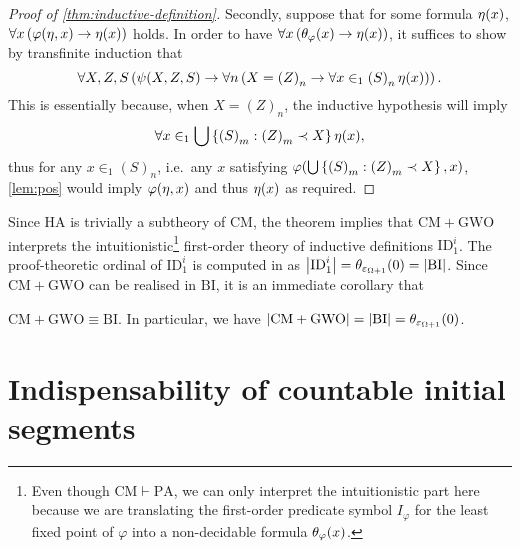 \documentclass[11pt]{article}
\theoremstyle{plain}
\theoremstyle{definition}
\begin{document}
\begin{proof}[Proof of \autoref{thm:inductive-definition}]
    Secondly, suppose that for some formula $\eta\mleft(x\mright)$, $\forall x \left(\varphi\mleft(\eta, x\mright) \rightarrow \eta\mleft(x\mright)\right)$ holds. In order to have $\forall x \left(\theta_\varphi\mleft(x\mright) \rightarrow \eta\mleft(x\mright)\right)$, it suffices to show by transfinite induction that
    \[\forall X, Z, S \left(\psi\mleft(X, Z, S\mright) \rightarrow \forall n \left(X = \left(Z\right)_n \rightarrow \forall x \in_1 \left(S\right)_n \eta\mleft(x\mright)\right)\right).\]
    This is essentially because, when $X = \left(Z\right)_n$, the inductive hypothesis will imply
    \[\forall x \in_1 \bigcup \left\{\left(S\right)_m : \left(Z\right)_m \prec X\right\} \eta\mleft(x\mright),\]
    thus for any $x \in_1 \left(S\right)_n$, i.e.\ any $x$ satisfying $\varphi\mleft(\bigcup \left\{\left(S\right)_m : \left(Z\right)_m \prec X\right\}, x\mright)$, \autoref{lem:pos} would imply $\varphi\mleft(\eta, x\mright)$ and thus $\eta\mleft(x\mright)$ as required.
\end{proof}

Since $\mathrm{HA}$ is trivially a subtheory of $\mathrm{CM}$, the theorem implies that $\mathrm{CM} + \mathrm{GWO}$ interprets the intuitionistic\footnote{Even though $\mathrm{CM} \vdash \mathrm{PA}$, we can only interpret the intuitionistic part here because we are translating the first-order predicate symbol $I_\varphi$ for the least fixed point of $\varphi$ into a non-decidable formula $\theta_\varphi\mleft(x\mright)$.} first-order theory of inductive definitions $\mathrm{ID}_1^i$. The proof-theoretic ordinal of $\mathrm{ID}_1^i$ is computed in \cite{buchholz-pohlers78-iterated-id} as $\left|\mathrm{ID}_1^i\right| = \theta_{\varepsilon_{\Omega + 1}}\mleft(0\mright) = \left|\mathrm{BI}\right|$. Since $\mathrm{CM} + \mathrm{GWO}$ can be realised in $\mathrm{BI}$, it is an immediate corollary that

\begin{corollary}
    $\mathrm{CM} + \mathrm{GWO} \equiv \mathrm{BI}$. In particular, we have $\left|\mathrm{CM} + \mathrm{GWO}\right| = \left|\mathrm{BI}\right| = \theta_{\varepsilon_{\Omega + 1}}\mleft(0\mright)$.
\end{corollary}

\section{Indispensability of countable initial segments}
\label{sec:countable-initial-segments}
\end{document}
